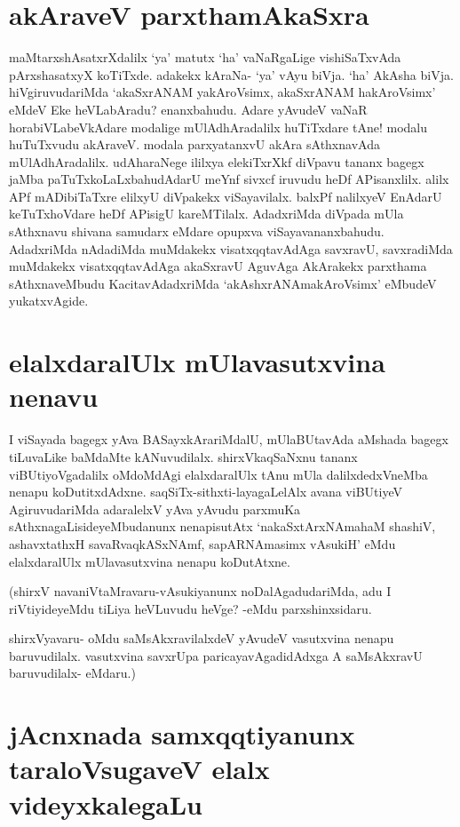 \section*{akAraveV parxthamAkaSxra}

maMtarxshAsatxrXdalilx `ya' matutx `ha' vaNaRgaLige vishiSaTxvAda pArxshasatxyX koTiTxde. adakekx kAraNa- `ya' vAyu biVja. `ha' AkAsha biVja. hiVgiruvudariMda `akaSxrANAM yakAroV\s simx, akaSxrANAM hakAroV\s simx' eMdeV Eke heVLabAradu? enanxbahudu. Adare yAvudeV vaNaR horabiVLabeVkAdare modalige mUlAdhAradalilx huTiTxdare tAne! modalu huTuTxvudu akAraveV. modala parxyatanxvU akAra sAthxnavAda mUlAdhAradalilx. udAharaNege ililxya elekiTxrXkf diVpavu tananx bagegx jaMba paTuTxkoLaLxbahudAdarU meYnf sivxcf iruvudu heDf APisanxlilx. alilx APf mADibiTaTxre elilxyU diVpakekx viSayavilalx. balxPf nalilxyeV EnAdarU keTuTxhoVdare heDf APisigU kareMTilalx. AdadxriMda diVpada mUla sAthxnavu shivana samudarx eMdare opupxva viSayavananxbahudu. AdadxriMda nAdadiMda muMdakekx visatxqqtavAdAga savxravU, savxradiMda muMdakekx visatxqqtavAdAga akaSxravU AguvAga AkArakekx parxthama sAthxnaveMbudu KacitavAdadxriMda `akAshxrANAmakAroV\s simx'\label{97} eMbudeV yukatxvAgide.

\section*{elalxdaralUlx mUlavasutxvina nenavu}

I viSayada bagegx yAva BASayxkArariMdalU, mUlaBUtavAda aMshada bagegx tiLuvaLike baMdaMte kANuvudilalx. shirxVkaqSaNxnu tananx viBUtiyoVgadalilx oMdoMdAgi elalxdaralUlx tAnu mUla dalilxdedxVneMba nenapu koDutitxdAdxne. saqSiTx-sithxti-layagaLelAlx avana viBUtiyeV AgiruvudariMda adaralelxV yAva yAvudu parxmuKa sAthxnagaLisideyeMbudanunx nenapisutAtx `nakaSxtArxNAmahaM shashiV, ashavxtathxH savaRvaqkASxNAmf,\label{98} sapARNAmasimx vAsukiH'\label{98b} eMdu elalxdaralUlx mUlavasutxvina nenapu koDutAtxne.

(shirxV navaniVtaMravaru-vAsukiyanunx noDalAgadudariMda, adu I riVtiyideyeMdu tiLiya heVLuvudu heVge? -eMdu parxshinxsidaru.

shirxVyavaru- oMdu saMsAkxravilalxdeV yAvudeV vasutxvina nenapu baruvudilalx. vasutxvina savxrUpa paricayavAgadidAdxga A saMsAkxravU baruvudilalx- eMdaru.)

\section*{jAcnxnada samxqqtiyanunx taraloVsugaveV elalx videyxkalegaLu}

